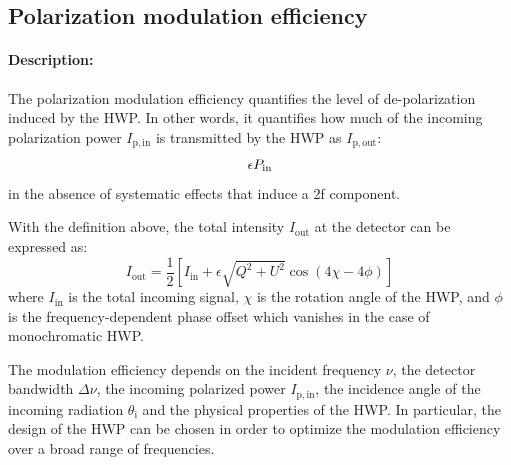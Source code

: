 
\subsection{Polarization modulation efficiency}\label{subsec:modeff}

\paragraph{Description:}
The polarization modulation efficiency quantifies the level of de-polarization induced by the HWP. In other words, it quantifies how much of the incoming polarization power $I_\mathrm{p,in}$ is transmitted by the HWP as $I_\mathrm{p,out}$:
\begin{equation}
\epsilon\def \frac{P_\mathrm{out}}{P_\mathrm{in}}
\end{equation}
in the absence of systematic effects that induce a 2f component.

With the definition above, the total intensity $I_\mathrm{out}$ at the detector can be expressed as:
\begin{equation}
I_\mathrm{out}=\frac{1}{2}\left[I_\mathrm{in}+\epsilon\sqrt{Q^2+U^2} \cos(4\chi-4\phi)\right]
\end{equation}
where $I_\mathrm{in}$ is the total incoming signal, $\chi$ is the rotation angle of the HWP, and $\phi$ is the frequency-dependent phase offset which vanishes in the case of monochromatic HWP.

The modulation efficiency depends on the incident frequency $\nu$, the detector bandwidth $\Delta \nu$, the incoming polarized power $I_\mathrm{p,in}$, the incidence angle of the incoming radiation $\theta_\mathrm{i}$ and the physical properties of the HWP. In particular, the design of the HWP can be chosen in order to optimize the modulation efficiency over a broad range of frequencies. 

